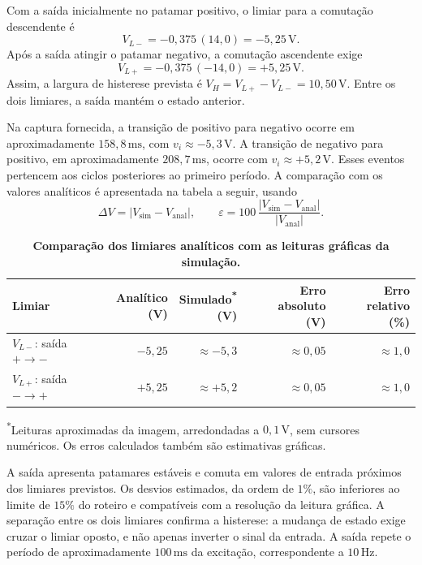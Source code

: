 \documentclass[11pt,a4paper]{article}
\begin{document}
Com a saída inicialmente no patamar positivo, o limiar para a comutação
descendente é
\[
V_{L-}=-0{,}375\,(14{,}0)=-5{,}25\,\mathrm{V}.
\]
Após a saída atingir o patamar negativo, a comutação ascendente exige
\[
V_{L+}=-0{,}375\,(-14{,}0)=+5{,}25\,\mathrm{V}.
\]
Assim, a largura de histerese prevista é
$V_H=V_{L+}-V_{L-}=10{,}50\,\mathrm{V}$.
Entre os dois limiares, a saída mantém o estado anterior.

Na captura fornecida, a transição de positivo para negativo ocorre em
aproximadamente $158{,}8\,\mathrm{ms}$, com
$v_i\approx-5{,}3\,\mathrm{V}$. A transição de negativo para positivo,
em aproximadamente $208{,}7\,\mathrm{ms}$, ocorre com
$v_i\approx+5{,}2\,\mathrm{V}$. Esses eventos pertencem aos ciclos
posteriores ao primeiro período. A comparação com os valores analíticos
é apresentada na tabela a seguir, usando
\[
\Delta V=\left|V_{\mathrm{sim}}-V_{\mathrm{anal}}\right|,
\qquad
\varepsilon=100\,
\frac{\left|V_{\mathrm{sim}}-V_{\mathrm{anal}}\right|}
{\left|V_{\mathrm{anal}}\right|}.
\]

\begin{table}[H]
\centering
\caption*{\textbf{Comparação dos limiares analíticos com as leituras gráficas da simulação.}}
\small
\begin{tabular}{@{}lrrrr@{}}
\toprule
Limiar & \shortstack{Analítico\\(V)} & \shortstack{Simulado\textsuperscript{*}\\(V)} & \shortstack{Erro absoluto\\(V)} & \shortstack{Erro relativo\\(\%)} \\
\midrule
$V_{L-}$: saída $+\to-$ & $-5{,}25$ & $\approx-5{,}3$ & $\approx0{,}05$ & $\approx1{,}0$ \\
$V_{L+}$: saída $-\to+$ & $+5{,}25$ & $\approx+5{,}2$ & $\approx0{,}05$ & $\approx1{,}0$ \\
\bottomrule
\end{tabular}

\vspace{4pt}
\begin{minipage}{0.96\linewidth}
\footnotesize
\textsuperscript{*}Leituras aproximadas da imagem, arredondadas a
$0{,}1\,\mathrm{V}$, sem cursores numéricos. Os erros calculados
também são estimativas gráficas.
\end{minipage}
\end{table}

A saída apresenta patamares estáveis e comuta em valores de entrada
próximos dos limiares previstos. Os desvios estimados, da ordem de
$1\%$, são inferiores ao limite de $15\%$ do roteiro e compatíveis com
a resolução da leitura gráfica. A separação entre os dois limiares
confirma a histerese: a mudança de estado exige cruzar o limiar oposto,
e não apenas inverter o sinal da entrada. A saída repete o período de
aproximadamente $100\,\mathrm{ms}$ da excitação, correspondente a
$10\,\mathrm{Hz}$.
\clearpage
\end{document}

